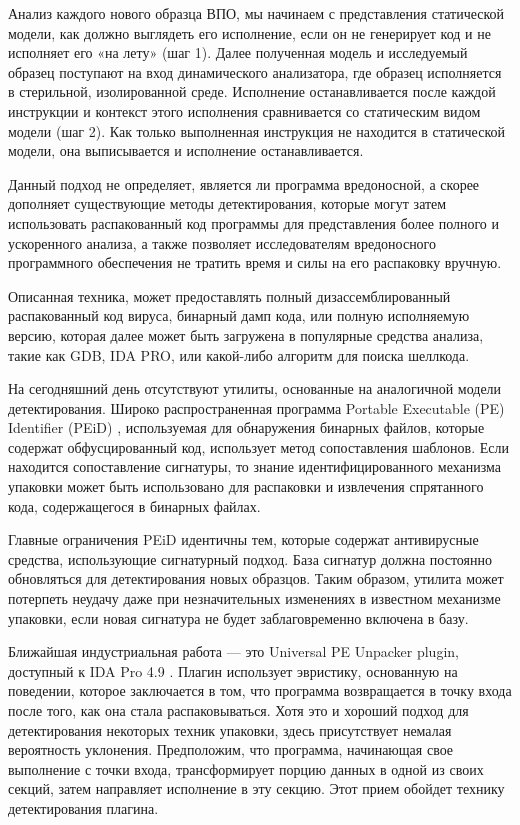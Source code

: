 \documentclass[oneside, final, 14pt]{extreport}
\begin{document}
Анализ каждого нового образца ВПО, мы начинаем с представления статической модели, как должно выглядеть его исполнение, если он не генерирует код и не исполняет его «на лету» (шаг 1). Далее  полученная модель и исследуемый образец поступают на вход динамического анализатора, где образец исполняется в стерильной, изолированной среде. Исполнение останавливается после каждой инструкции и контекст этого исполнения сравнивается со статическим видом модели (шаг 2). Как только выполненная инструкция не находится в статической модели, она выписывается и исполнение останавливается.

Данный подход не определяет, является ли программа вредоносной, а скорее дополняет существующие методы детектирования, которые могут затем использовать распакованный код программы для представления более полного и ускоренного анализа, а также позволяет исследователям вредоносного программного обеспечения не тратить время и силы на его распаковку вручную. 
 
Описанная техника, может предоставлять полный дизассемблированный распакованный код вируса, бинарный дамп кода, или полную исполняемую версию, которая далее может быть загружена в популярные средства анализа, такие как GDB, IDA PRO, или какой-либо алгоритм для поиска шеллкода.

На сегодняшний день отсутствуют утилиты, основанные на аналогичной модели детектирования. Широко распространенная программа Portable Executable (PE) Identifier (PEiD) \cite{peid}, используемая для обнаружения бинарных файлов, которые содержат обфусцированный код, использует метод сопоставления шаблонов. Если находится сопоставление сигнатуры, то знание идентифицированного механизма упаковки может быть использовано для распаковки и извлечения спрятанного кода, содержащегося в бинарных файлах.

Главные ограничения PEiD идентичны тем, которые содержат антивирусные средства, использующие сигнатурный подход. База сигнатур должна постоянно обновляться для детектирования новых образцов.  Таким образом, утилита может потерпеть неудачу даже при незначительных изменениях в  известном механизме упаковки, если новая сигнатура не будет заблаговременно включена в базу.

Ближайшая индустриальная работа --- это Universal PE Unpacker plugin,  доступный к IDA Pro 4.9 \cite{ida}. Плагин использует эвристику, основанную на поведении, которое заключается в том, что программа возвращается в точку входа после того, как она стала распаковываться. Хотя это и хороший подход для детектирования некоторых техник упаковки, здесь присутствует немалая вероятность уклонения. Предположим, что программа, начинающая свое выполнение с точки входа, трансформирует порцию данных в одной из своих секций, затем направляет исполнение в эту секцию. Этот прием обойдет технику детектирования плагина. 
\end{document}
